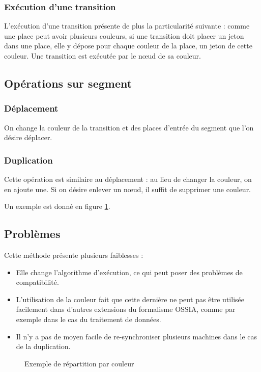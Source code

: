 \subsubsection{Exécution d'une transition}
L'exécution d'une transition présente de plus la particularité suivante : comme une place peut avoir plusieurs couleurs, si une transition doit placer un jeton dans une place, elle y dépose pour chaque couleur de la place, un jeton de cette couleur. 
Une transition est exécutée par le nœud de sa couleur.

\subsection{Opérations sur segment}
\subsubsection{Déplacement}
On change la couleur de la transition et des places d'entrée du segment que l'on désire déplacer.

\subsubsection{Duplication}
Cette opération est similaire au déplacement : au lieu de changer la couleur, on en ajoute une. Si on désire enlever un nœud, il suffit de supprimer une couleur.

Un exemple est donné en figure \ref{fig:repartCouleur}.

\subsection{Problèmes}
Cette méthode présente plusieurs faiblesses : 
\begin{itemize}
	\item Elle change l'algorithme d'exécution, ce qui peut poser des problèmes de compatibilité.
	\item L'utilisation de la couleur fait que cette dernière ne peut pas être utilisée facilement dans d'autres extensions du formalisme \ac{OSSIA}, comme par exemple dans le cas du traitement de données\cite{arias2014modelling}.
	\item Il n'y a pas de moyen facile de re-synchroniser plusieurs machines dans le cas de la duplication.
\end{itemize}

\begin{figure}[H]
	\centering
	
	\caption{Exemple de répartition par couleur} 
	\label{fig:repartCouleur}
\end{figure}


